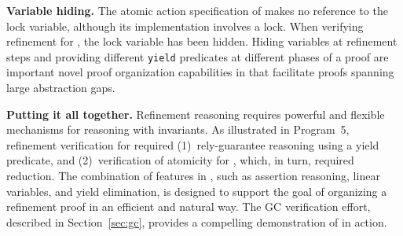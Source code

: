 {\bf Variable hiding.} The atomic action specification of 
makes no reference to the lock variable, although its implementation
involves a lock. When verifying refinement for , the lock
variable has been hidden. Hiding variables at refinement steps and
providing different {\tt yield} predicates at different phases of a
proof are important novel proof organization capabilities in \civl
that facilitate proofs spanning large abstraction gaps.

{\bf Putting it all together.} 
Refinement reasoning requires powerful and
flexible mechanisms for reasoning with invariants.  
As illustrated in Program~5, refinement verification for  required 
(1)~rely-guarantee reasoning using a yield predicate, and 
(2)~verification of atomicity for , which, in turn, required reduction. 
The combination of features in \civl, such as assertion reasoning, linear variables, and yield elimination,
is designed to support the goal of organizing a
refinement proof in an efficient and natural way.
The GC verification effort, described in Section~\ref{sec:gc}, provides a compelling demonstration of \civl in action.



